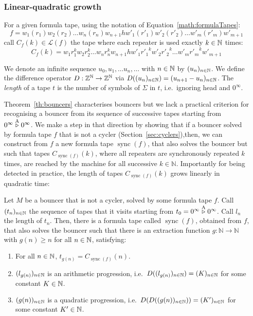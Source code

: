 \subsubsection{Linear-quadratic growth}

For a given formula tape, using the notation of Equation~\ref{math:formulaTapes}: $$f=w_1(r_1)w_2(r_2)\dots w_n(r_n) w_{n+1} h w'_1(r'_1)w'_2(r'_2)\dots w'_m(r'_m) w'_{m+1}$$ call $C_f(k) \in \mathcal{L}(f)$ the tape where each repeater is used exactly $k \in \mathbb{N}$ times: $$C_f(k)=w_1 r_1^k w_2 r_2^k\dots w_n r_n^k w_{n+1} h w'_1 {r'_1}^k w'_2 {r'_2}^k \dots w'_m {r'_m}^k w'_{m+1}$$

We denote an infinite sequence $u_0, u_1, \dots u_n, \dots$ with $n\in\mathbb{N}$ by $(u_n)_{n\in\mathbb{N}}$. We define the difference operator $D: \mathbb{Z}^{\mathbb{N}} \to \mathbb{Z}^{\mathbb{N}}$ via $D((u_n)_{n\in\mathbb{N}})=(u_{n+1}-u_{n})_{n\in\mathbb{N}}$. The \textit{length} of a tape $t$ is the number of symbols of $\Sigma$ in $t$, i.e.\ ignoring head and $0^\infty$.

\newcommand{\sync}[1]{\operatorname{sync}(#1)}

Theorem~\ref{th:bouncers} characterises bouncers but we lack a practical criterion for recognising a bouncer from its sequence of successive tapes starting from $0^\infty \stackrel{\text{A}}\triangleright 0^\infty$. We make a step in that direction by showing that if a bouncer solved by formula tape $f$ that is not a cycler (Section~\ref{sec:cyclers}),then, we can construct from $f$ a new formula tape $\sync{f}$, that also solves the bouncer but such that tapes $C_{\sync{f}}(k)$, where all repeaters are synchronously repeated $k$ times, are reached by the machine for all successive $k\in\mathbb{N}$. Importantly for being detected in practice, the length of tapes $C_{\sync{f}}(k)$ grows linearly in quadratic time:



\begin{theorem}\label{th:linquad}
    Let $M$ be a bouncer that is not a cycler, solved by some formula tape $f$. Call $(t_n)_{n\in\mathbb{N}}$ the sequence of tapes that it visits starting from $t_0 = 0^\infty \stackrel{\text{A}}\triangleright 0^\infty$. Call $l_n$ the length of $t_n$. Then, there is a formula tape called $\sync{f}$, obtained from $f$, that also solves the bouncer such that there is an extraction function $g: \mathbb{N} \to \mathbb{N}$ with $g(n) \geq n$ for all $n\in\mathbb{N}$, satisfying:

    \begin{enumerate}
        \item For all $n\in\mathbb{N}$, $t_{g(n)} = C_{\sync{f}}(n)$.
        \item $(l_{g(n)})_{n\in\mathbb{N}}$ is an arithmetic progression, i.e.\ $D((l_{g(n)})_{n\in\mathbb{N}}) = (K)_{n\in\mathbb{N}}$ for some constant $K\in\mathbb{N}$.
        \item $(g(n))_{n\in\mathbb{N}}$ is a quadratic progression, i.e.\ $D(D((g(n))_{n\in\mathbb{N}})) = (K')_{n\in\mathbb{N}}$ for some constant $K'\in\mathbb{N}$.
    \end{enumerate}
\end{theorem}

